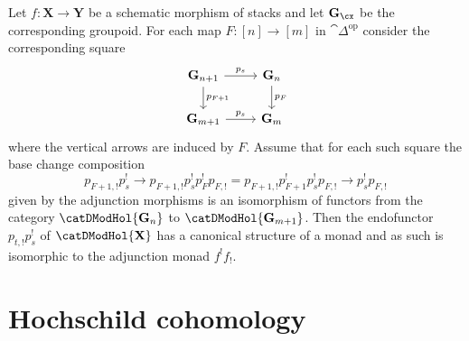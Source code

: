 \documentclass[english]{ck-article}
\let\stack\mathbf
\begin{document}
\begin{Lem}
    \label{lem:pre:groupoid_monad_hol}%
    Let $f\colon \stack X → \stack Y$ be a schematic morphism of stacks and let $\stack G_\cx$ be the corresponding groupoid.
    For each map $F\colon [n] → [m]$ in $\cat{Δ}^{\mathrm{op}}$ consider the corresponding square
    \[
        \begin{tikzcd}
            \stack G_{n+1} \arrow[r, "p_s"] \arrow[d, "p_{F+1}"] & \stack G_n \arrow[d, "p_F"] \\
            \stack G_{m+1} \arrow[r, "p_s"] & \stack G_m
        \end{tikzcd}
    \]
    where the vertical arrows are induced by $F$.
    Assume that for each such square the base change composition
    \[
        p_{F+1,!} p_s^! →
        p_{F+1,!} p_s^! p_F^! p_{F,!} =
        p_{F+1,!} p_{F+1}^! p_s^!  p_{F,!} →
        p_s^! p_{F,!}
    \]
    given by the adjunction morphisms is an isomorphism of functors from the category $\catDModHol{\stack G_n}$ to $\catDModHol{\stack G_{m+1}}$.
    Then the endofunctor $p_{t,!} p_s^!$ of $\catDModHol{\stack X}$ has a canonical structure of a monad and as such is isomorphic to the adjunction monad $f^!f_!$.
\end{Lem}

\section{Hochschild cohomology}
\label{sec:HH}
\end{document}
